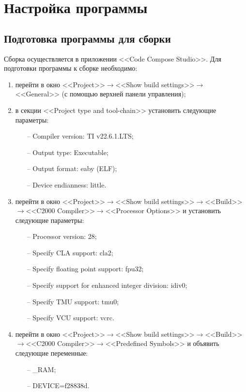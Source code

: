 \newpage
\section{Настройка программы}

\subsection{Подготовка программы для сборки}
Сборка осуществляется в приложении <<Code Compose Studio>>. Для подготовки программы к сборке необходимо:
\begin{enumerate}
    \item перейти в окно <<Project>>$\to$<<Show build settings>>$\to$<<General>> (с помощью верхней панели управления);
    \item в секции <<Project type and tool-chain>> установить следующие параметры:
    \begin{itemize}
        \item[--] Compiler version: TI v22.6.1.LTS;
        \item[--] Output type: Executable;
        \item[--] Output format: eaby (ELF);
        \item[--] Device endianness: little.
    \end{itemize}
    \item перейти в окно <<Project>>$\to$<<Show build settings>>$\to$<<Build>>$\to$<<C2000 Compiler>>$\to$<<Processor Options>> и установить следующие параметры:
    \begin{itemize}
        \item[--] Processor version: 28;
        \item[--] Specify CLA support: cla2;
        \item[--] Specify floating point support: fpu32;
        \item[--] Specify support for enhanced integer division: idiv0;
        \item[--] Specify TMU support: tmu0;
        \item[--] Specify VCU support: vcrc.
    \end{itemize}
    \item перейти в окно <<Project>>$\to$<<Show build settings>>$\to$<<Build>>$\to$<<C2000 Compiler>>$\to$<<Predefined Symbols>> и объявить следующие переменные:
    \begin{itemize}
        \item[--] \_RAM;
        \item[--] DEVICE=f28838d.
    \end{itemize}
\end{enumerate}

